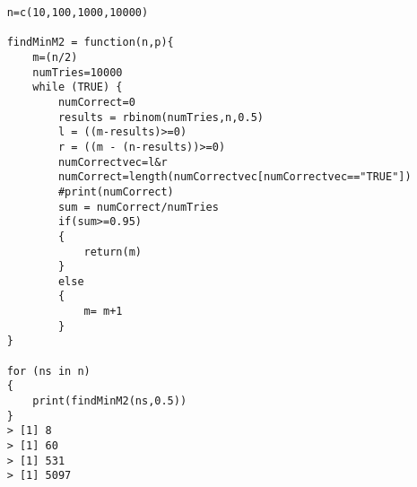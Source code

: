 \documentclass[11pt]{article}
\begin{document}
\begin{enumerate}
\begin{verbatim}
	n=c(10,100,1000,10000)

	findMinM2 = function(n,p){
		m=(n/2) 
		numTries=10000
		while (TRUE) {
			numCorrect=0
			results = rbinom(numTries,n,0.5)
			l = ((m-results)>=0)
			r = ((m - (n-results))>=0)
			numCorrectvec=l&r
			numCorrect=length(numCorrectvec[numCorrectvec=="TRUE"])
			#print(numCorrect)
			sum = numCorrect/numTries
			if(sum>=0.95)
			{
				return(m)
			}
			else
			{
				m= m+1
			}
	}
	
	for (ns in n)
	{
		print(findMinM2(ns,0.5))
	}
	> [1] 8
	> [1] 60
	> [1] 531
	> [1] 5097
\end{verbatim}

\end{enumerate}
\end{document}
